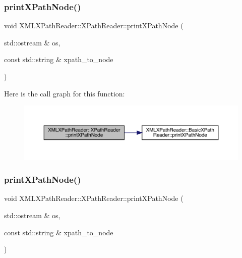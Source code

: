 \subsubsection{\texorpdfstring{printXPathNode()}{printXPathNode()}\hspace{0.1cm}{\footnotesize\ttfamily [1/3]}}
{\footnotesize\ttfamily void X\+M\+L\+X\+Path\+Reader\+::\+X\+Path\+Reader\+::print\+X\+Path\+Node (\begin{DoxyParamCaption}\item[{std\+::ostream \&}]{os,  }\item[{const std\+::string \&}]{xpath\+\_\+to\+\_\+node }\end{DoxyParamCaption})\hspace{0.3cm}{\ttfamily [inline]}}

Here is the call graph for this function\+:
\nopagebreak
\begin{figure}[H]
\begin{center}
\leavevmode
\includegraphics[width=350pt]{d3/d5a/classXMLXPathReader_1_1XPathReader_a8f751fb071319179252a48075239559c_cgraph}
\end{center}
\end{figure}
\mbox{\label{classXMLXPathReader_1_1XPathReader_a8f751fb071319179252a48075239559c}} 
\subsubsection{\texorpdfstring{printXPathNode()}{printXPathNode()}\hspace{0.1cm}{\footnotesize\ttfamily [2/3]}}
{\footnotesize\ttfamily void X\+M\+L\+X\+Path\+Reader\+::\+X\+Path\+Reader\+::print\+X\+Path\+Node (\begin{DoxyParamCaption}\item[{std\+::ostream \&}]{os,  }\item[{const std\+::string \&}]{xpath\+\_\+to\+\_\+node }\end{DoxyParamCaption})\hspace{0.3cm}{\ttfamily [inline]}}

